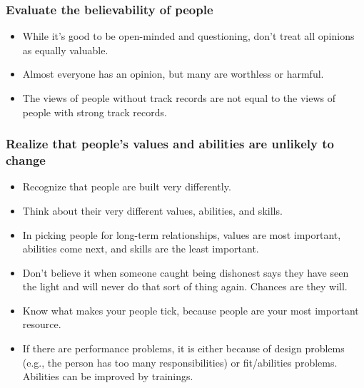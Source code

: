 \begin{frame}[fragile]\frametitle{Evaluate the believability of people}

\begin{itemize}
\item While it’s good to be open-minded and questioning, don’t treat all opinions as equally valuable. 
\item Almost everyone has an opinion, but many are worthless or harmful. 
\item The views of people without track records are not equal to the views of people with strong track records.
\end{itemize}

\end{frame}

\begin{frame}[fragile]\frametitle{Realize that people's values and abilities are unlikely to change}

\begin{itemize}
\item Recognize that people are built very differently. 
\item Think about their very different values, abilities, and skills. 
\item In picking people for long-term relationships, values are most important, abilities come next, and skills are the least important.
\item Don’t believe it when someone caught being dishonest says they have seen the light and will never do that sort of thing again. Chances are they will. 
\item Know what makes your people tick, because people are your most important resource. 
\item If there are performance problems, it is either because of design problems (e.g., the person has too many responsibilities) or fit/abilities problems. Abilities can be improved by trainings.
\end{itemize}

\end{frame}

